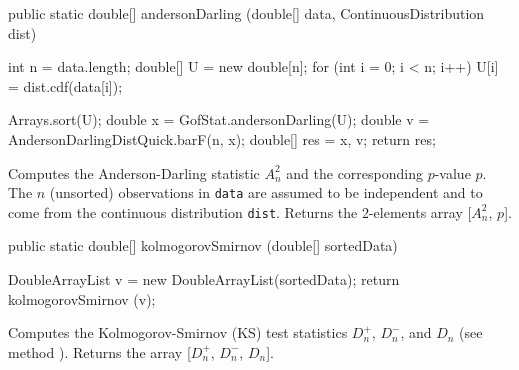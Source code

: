 \begin{htmlonly}
\end{htmlonly}
\begin{code}

   public static double[] andersonDarling (double[] data,
                                           ContinuousDistribution dist)
   \begin{hide} {
      int n = data.length;
      double[] U = new double[n];
      for (int i = 0; i < n; i++) {
         U[i] = dist.cdf(data[i]);
      }

      Arrays.sort(U);
      double x = GofStat.andersonDarling(U);
      double v = AndersonDarlingDistQuick.barF(n, x);
      double[] res = {x, v};
      return res;
   }\end{hide}
\end{code}
\begin{tabb} Computes the Anderson-Darling statistic $A_n^2$
and the corresponding $p$-value $p$. The $n$ (unsorted) observations in \texttt{data}
are assumed to be independent and to come from the continuous
distribution \texttt{dist}.
Returns the 2-elements array [$A_n^2$, $p$].
 \end{tabb}
\begin{htmlonly}
\end{htmlonly}
\begin{code}

   public static double[] kolmogorovSmirnov (double[] sortedData)\begin{hide} {
      DoubleArrayList v = new DoubleArrayList(sortedData);
      return kolmogorovSmirnov (v);
   }\end{hide}
\end{code}
\begin{tabb} Computes the Kolmogorov-Smirnov (KS) test statistics
 $D_n^+$, $D_n^-$, and $D_n$ (see method
 ). Returns the array [$D_n^+$, $D_n^-$, $D_n$].
\end{tabb}
\begin{htmlonly}
\end{htmlonly}
